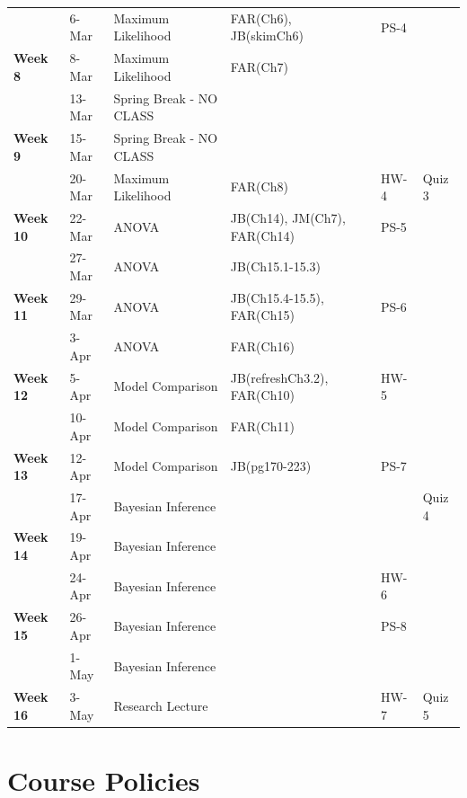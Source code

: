 \documentclass[
  letterpaper,
  DIV=11,
  numbers=noendperiod]{scrreprt}
\begin{document}
\begin{table}
\begin{tabular}[t]{>{}l|l|l|l|l|l}
\cline{1-6}
 & 6-Mar & Maximum Likelihood & FAR(Ch6), JB(skimCh6) & PS-4 & \\
\cline{2-6}
\multirow{-2}{*}{\raggedright\arraybackslash \textbf{Week 8}} & 8-Mar & Maximum Likelihood & FAR(Ch7) &  & \\
\cline{1-6}
 & 13-Mar & Spring Break - NO CLASS &  &  & \\
\cline{2-6}
\multirow{-2}{*}{\raggedright\arraybackslash \textbf{Week 9}} & 15-Mar & Spring Break - NO CLASS &  &  & \\
\cline{1-6}
 & 20-Mar & Maximum Likelihood & FAR(Ch8) & HW-4 & Quiz 3\\
\cline{2-6}
\multirow{-2}{*}{\raggedright\arraybackslash \textbf{Week 10}} & 22-Mar & ANOVA & JB(Ch14), JM(Ch7), FAR(Ch14) & PS-5 & \\
\cline{1-6}
 & 27-Mar & ANOVA & JB(Ch15.1-15.3) &  & \\
\cline{2-6}
\multirow{-2}{*}{\raggedright\arraybackslash \textbf{Week 11}} & 29-Mar & ANOVA & JB(Ch15.4-15.5), FAR(Ch15) & PS-6 & \\
\cline{1-6}
 & 3-Apr & ANOVA & FAR(Ch16) &  & \\
\cline{2-6}
\multirow{-2}{*}{\raggedright\arraybackslash \textbf{Week 12}} & 5-Apr & Model Comparison & JB(refreshCh3.2), FAR(Ch10) & HW-5 & \\
\cline{1-6}
 & 10-Apr & Model Comparison & FAR(Ch11) &  & \\
\cline{2-6}
\multirow{-2}{*}{\raggedright\arraybackslash \textbf{Week 13}} & 12-Apr & Model Comparison & JB(pg170-223) & PS-7 & \\
\cline{1-6}
 & 17-Apr & Bayesian Inference &  &  & Quiz 4\\
\cline{2-6}
\multirow{-2}{*}{\raggedright\arraybackslash \textbf{Week 14}} & 19-Apr & Bayesian Inference &  &  & \\
\cline{1-6}
 & 24-Apr & Bayesian Inference &  & HW-6 & \\
\cline{2-6}
\multirow{-2}{*}{\raggedright\arraybackslash \textbf{Week 15}} & 26-Apr & Bayesian Inference &  & PS-8 & \\
\cline{1-6}
 & 1-May & Bayesian Inference &  &  & \\
\cline{2-6}
\multirow{-2}{*}{\raggedright\arraybackslash \textbf{Week 16}} & 3-May & Research Lecture &  & HW-7 & Quiz 5\\
\hline
\end{tabular}
\end{table}

\hypertarget{course-policies}{%
\section{Course Policies}\label{course-policies}}
\end{document}
